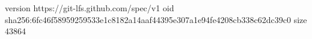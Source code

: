version https://git-lfs.github.com/spec/v1
oid sha256:6fc46f58959259533e1c8182a14aaf44395e307a1e94fe4208cb338c62dc39c0
size 43864
